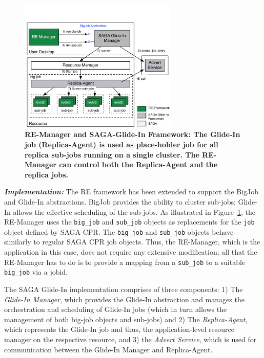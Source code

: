\documentclass{rspublic}
\newcommand{\replicaagent}[1]{Replica-Agent }
\newcommand{\remanager}[1]{RE-Manager }
\begin{document}
\begin{figure}[t]
	    \begin{center}  
	      \includegraphics[width=0.67\textwidth]{re_bigjob_interactions_v2}
	      \caption{\footnotesize \bf RE-Manager and SAGA-Glide-In Framework:
	        The Glide-In job (Replica-Agent) is used as place-holder job
	        for all replica sub-jobs running on a single cluster. The
	        \remanager\ can control both the \replicaagent\ and the replica
	        jobs.\vspace*{-3em}}
	        \label{fig:remdmanager_v1.1}   
	    \end{center}
\end{figure}

{\noindent \it \bf Implementation:} The RE framework has been
extended to support the BigJob and Glide-In abstractions.
BigJob provides the ability to cluster sub-jobs; Glide-In allows the
effective scheduling of the sub-jobs.  As illustrated in
Figure~\ref{fig:remdmanager_v1.1}, the RE-Manager uses the
\texttt{big\_job} and \texttt{sub\_job} objects as replacements for the
\texttt{job} object defined by SAGA CPR.  The \texttt{big\_job} and
\texttt{sub\_job} objects behave similarly to regular SAGA CPR job
objects. Thus, the RE-Manager, which is the application in this case,
does not require any extensive modification; 
all that the RE-Manager has to do is to provide a mapping 
from a \texttt{sub\_job} to a suitable \texttt{big\_job} via a jobid.

The SAGA Glide-In implementation comprises of three components: 1) The
\emph{Glide-In Manager}, which provides the Glide-In abstraction and
manages the orchestration and scheduling 
of Glide-In jobs (which in turn allows
the management of both big-job objects and sub-jobs) and 2) The
\emph{Replica-Agent}, which represents the Glide-In job and thus, the
application-level resource manager on the respective resource, and 3)
the \emph{Advert Service}, which is used for communication between the
Glide-In Manager and Replica-Agent.
\end{document}
